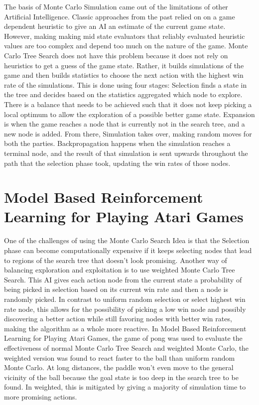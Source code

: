 \documentclass[11pt]{article}
\begin{document}
The basis of Monte Carlo Simulation came out of the limitations of other Artificial Intelligence. Classic approaches from the past relied on on a game dependent heuristic to give an AI an estimate of the current game state. However, making making mid state evaluators that reliably evaluated heuristic values are too complex and depend too much on the nature of the game. \cite{chaslot2008monte} Monte Carlo Tree Search does not have this problem because it does not rely on heuristics to get a guess of the game state. Rather, it builds simulations of the game and then builds statistics to choose the next action with the highest win rate of the simulations. This is done using four stages: Selection finds a state in the tree and decides based on the statistics aggregated which node to explore. There is a balance that needs to be achieved such that it does not keep picking a local optimum to allow the exploration of a possible better game state. Expansion is when the game reaches a node that is currently not in the search tree, and a new node is added. From there, Simulation takes over, making random moves for both the parties. Backpropagation happens when the simulation reaches a terminal node, and the result of that simulation is sent upwards throughout the path that the selection phase took, updating the win rates of those nodes. 

\section{Model Based Reinforcement Learning for Playing Atari Games}

One of the challenges of using the Monte Carlo Search Idea is that the Selection phase can become computationally expensive if it keeps selecting nodes that lead to regions of the search tree that doesn't look promising. Another way of balancing exploration and exploitation is to use weighted Monte Carlo Tree Search. This AI gives each action node from the current state a probability of being picked in selection based on its current win rate and then a node is randomly picked. In contrast to uniform random selection or select highest win rate node, this allows for the possibility of picking a low win node and possibly discovering a better action while still favoring nodes with better win rates, making the algorithm as a whole more reactive. In Model Based Reinforcement Learning for Playing Atari Games, the game of pong was used to evaluate the effectiveness of normal Monte Carlo Tree Search and weighted Monte Carlo, the weighted version was found to react faster to the ball than uniform random Monte Carlo. \cite{fumodel} At long distances, the paddle won’t even move to the general vicinity of the ball because the goal state is too deep in the search tree to be found. In weighted, this is mitigated by giving a majority of simulation time to more promising actions.
\end{document}
